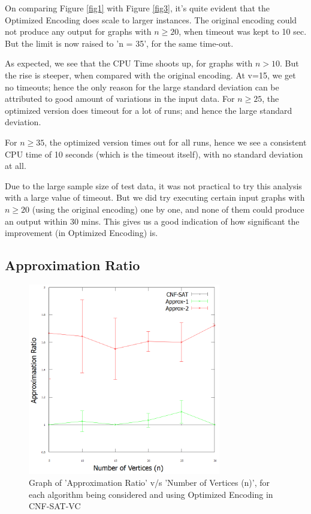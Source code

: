 \documentclass[11pt]{llncs}
\begin{document}
	\vspace{-6mm}

	On comparing Figure \ref{fig1} with Figure \ref{fig3}, it's quite evident that the Optimized Encoding does scale to larger instances. The original encoding could not produce any output for graphs with $n \ge 20$, when timeout was kept to 10 sec. But the limit is now raised to 'n = 35', for the same time-out.

	As expected, we see that the CPU Time shoots up, for graphs with $n > 10$. But the rise is steeper, when compared with the original encoding. At v=15, we get no timeouts; hence the only reason for the large standard deviation can be attributed to good amount of variations in the input data. For $n \ge 25$, the optimized version does timeout for a lot of runs; and hence the large standard deviation.

	For $n \ge 35$, the optimized version times out for all runs, hence we see a consistent CPU time of 10 seconds (which is the timeout itself), with no standard deviation at all.

	Due to the large sample size of test data, it was not practical to try this analysis with a large value of timeout. But we did try executing certain input graphs with $n \ge 20$ (using the original encoding) one by one, and none of them could produce an output within 30 mins. This gives us a good indication of how significant the improvement (in Optimized Encoding) is.
 
\newpage
     \subsection{Approximation Ratio}
		\begin{figure}[H]
			\includegraphics[width=0.75\textwidth]{optimized_ar_vs_n.png}
			\caption{Graph of 'Approximation Ratio' v/s 'Number of Vertices (n)', for each algorithm being considered and using Optimized Encoding in CNF-SAT-VC} \label{fig4}
		\end{figure}
\end{document}
